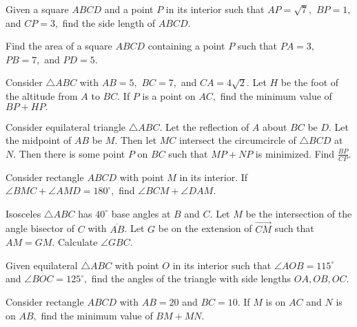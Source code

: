 \documentclass[mast]{lucky}
\begin{document}
    \begin{prob}[]{4}
Given a square $ABCD$ and a point $P$ in its interior such that $AP=\sqrt{7},$ $BP=1,$ and $CP=3,$ find the side length of $ABCD.$
\end{prob}

	 \begin{prob}[]{4}
     Find the area of a square $ABCD$ containing a point $P$ such that $PA=3,$ $PB=7,$ and $PD=5.$
    \end{prob}

    \begin{prob}[ART 2019/3]{4}
Consider $\triangle ABC$ with $AB=5,$ $BC=7,$ and $CA=4\sqrt{2}.$ Let $H$ be the foot of the altitude from $A$ to $BC.$ If $P$ is a point on $AC,$ find the minimum value of $BP+HP.$
\end{prob}
    
    \begin{prob}[ART 2020/2]{4}
Consider equilateral triangle $\triangle ABC.$ Let the reflection of $A$ about $BC$ be $D.$ Let the midpoint of $AB$ be $M.$ Then let $MC$ intersect the circumcircle of $\triangle BCD$ at $N.$ Then there is some point $P$ on $BC$ such that $MP+NP$ is minimized. Find $\frac{BP}{CP}.$
\end{prob}

    \begin{prob}[MOP]{4}
Consider rectangle $ABCD$ with point $M$ in its interior. If $\angle BMC+\angle AMD=180^{\circ},$ find $\angle BCM+\angle DAM.$
\end{prob}

    \begin{prob}[]{4}
Isosceles $\triangle ABC$ has $40^\circ$ base angles at $B$ and $C$. Let $M$ be the intersection of the angle bisector of $C$ with $\overline{AB}$. Let $G$ be on the extension of $\overrightarrow{CM}$ such that $AM = GM$. Calculate $\angle GBC$.
\end{prob}

    \begin{prob}[]{4}
    Given equilateral $\triangle ABC$ with point $O$ in its interior such that $\angle AOB=115^{\circ}$ and $\angle BOC=125^{\circ},$ find the angles of the triangle with side lengths $OA,OB,OC.$
    \end{prob}
    
    \begin{prob}[]{4}
    Consider rectangle $ABCD$ with $AB=20$ and $BC=10.$ If $M$ is on $AC$ and $N$ is on $AB,$ find the minimum value of $BM+MN.$
    \end{prob}
\end{document}
